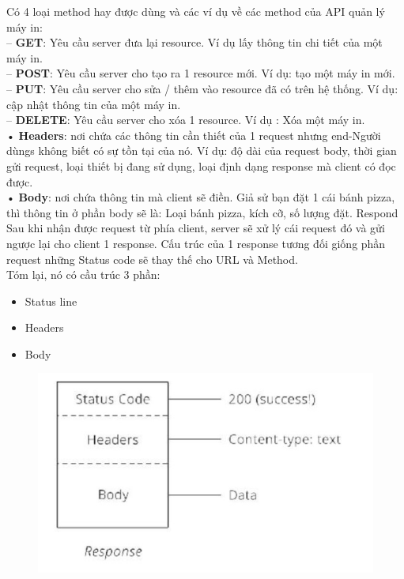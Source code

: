 \documentclass[a4paper]{article}
\begin{document}
 Có 4 loại method hay được dùng và các ví dụ về các method của API quản lý máy in:\\
– \textbf{GET}: Yêu cầu server đưa lại resource. Ví dụ lấy thông tin chi tiết của một máy in.\\
– \textbf{POST}: Yêu cầu server cho tạo ra 1 resource mới. Ví dụ: tạo một máy in mới.\\
– \textbf{PUT}: Yêu cầu server cho sửa / thêm vào resource đã có trên hệ thống. Ví dụ:
cập nhật thông tin của một máy in.\\
– \textbf{DELETE}: Yêu cầu server cho xóa 1 resource. Ví dụ : Xóa một máy in.\\
• \textbf{Headers}: nơi chứa các thông tin cần thiết của 1 request nhưng end-Người dùngs không biết có sự tồn tại của nó. Ví dụ: độ dài của request body, thời gian gửi request, loại thiết bị đang sử dụng, loại định dạng response mà client có đọc được.\\
• \textbf{Body}: nơi chứa thông tin mà client sẽ điền. Giả sử bạn đặt 1 cái bánh pizza, thì thông tin ở phần body sẽ là: Loại bánh pizza, kích cỡ, số lượng đặt.
Respond\\
Sau khi nhận được request từ phía client, server sẽ xử lý cái request đó và gửi ngược lại cho client 1 response. Cấu trúc của 1 response tương đối giống phần request những Status code sẽ thay thế cho URL và Method. \\Tóm lại, nó có cầu trúc 3 phần:
\begin{itemize}
    \item Status line
    \item Headers
    \item Body
\end{itemize}
\begin{figure}[h!]
\begin{center}
\includegraphics[width=14cm]{picture/anh 4.jpg}
\end{center}
\end{figure}
\end{document}
